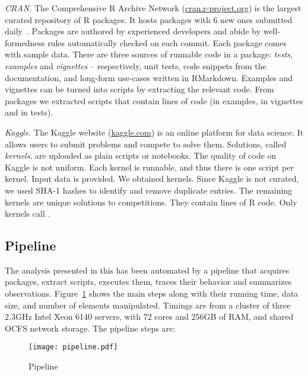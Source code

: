 \documentclass[review,nonacm,screen,acmsmall,anonymous=true]{acmart}
\newcommand{\mypara}[1]{\medskip\noindent\emph{#1}\xspace}
\begin{document}
\mypara{CRAN.} The Comprehensive R Archive Network
({\small \url{cran.r-project.org}}) is the largest curated repository of R
packages. It hosts \CranAvailablePackagesRnd packages with 6 new ones submitted
daily~\cite{Ligges2017}. Packages are authored by experienced developers and
abide by well-formedness rules automatically checked on each commit.
Each package comes with sample data. There are three sources of
runnable code in a package: \emph{tests, examples} and \emph{vignettes} --
respectively, unit tests, code snippets from the documentation, and long-form
use-cases written in RMarkdown. Examples and vignettes can be turned into
scripts by extracting the relevant code. From \CranPackages packages we
extracted \CranRunnableScripts scripts that contain \CranRunnableCode lines of
code (\CranRunnableCodeExamplesRnd in examples, \CranRunnableCodeVignettesRnd in
vignettes and \CranRunnableCodeTestsRnd in tests).

\mypara{Kaggle.} The Kaggle website ({\small \url{kaggle.com}}) is an online
platform for data science. It allows users to submit problems and compete to
solve them. Solutions, called \emph{kernels}, are uploaded as plain scripts or
notebooks. The quality of code on Kaggle is not uniform. Each kernel is
runnable, and thus there is one script per kernel. Input data is provided. We
obtained \KaggleKernels kernels. Since Kaggle is not curated, we used SHA-1 hashes
to identify and remove \KaggleDuplicates duplicate entries. The remaining
\KaggleUnique kernels are unique solutions to \KaggleCompetitions competitions.
They contain \KaggleCode lines of R code. Only \KaggleWithEvals kernels call
\eval.

\subsection{Pipeline}

The analysis presented in this has been automated by a pipeline that acquires
packages, extract scripts, executes them, traces their behavior and summarizes
observations. Figure~\ref{fig:pipeline} shows the main steps along with their
running time, data size, and number of elements manipulated. Timings are from a
cluster of three 2.3GHz Intel Xeon 6140 servers, with 72 cores and 256GB of RAM,
and shared OCFS network storage. The pipeline steps are:


\begin{figure}[!h]\hspace{-5mm}
  \texttt{[image: pipeline.pdf]}
  \caption{Pipeline}\label{fig:pipeline}
\end{figure}
\end{document}
